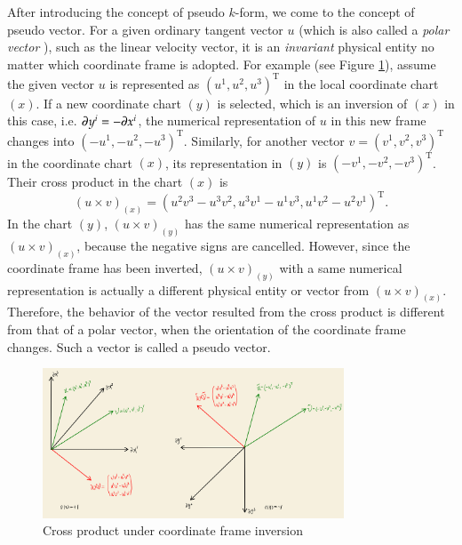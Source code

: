 \documentclass[11pt, a4paper]{book}
\begin{document}
After introducing the concept of pseudo $k$-form, we come to the concept of pseudo vector.
For a given ordinary tangent vector $u$ (which is also called a \emph{polar vector}
\citep{Pseudovector2023}), such as the linear velocity vector, it is an \emph{invariant}
physical entity no matter which coordinate frame is adopted. For example (see Figure
\ref{fig:cross-product-under-inversion}), assume the given vector $u$ is represented as
$(u^1,u^2,u^3)^{\mathrm{T}}$ in the local coordinate chart $(x)$. If a new coordinate
chart $(y)$ is selected, which is an inversion of $(x)$ in this case, i.e.
$\boldsymbol{\partial}y^i = -\boldsymbol{\partial}x^i$, the numerical representation of $u$ in this new
frame changes into $(-u^1,-u^2,-u^3)^{\mathrm{T}}$. Similarly, for another vector
$v = (v^1,v^2,v^3)^{\mathrm{T}}$ in the coordinate chart $(x)$, its representation in
$(y)$ is $(-v^1,-v^2,-v^3)^{\mathrm{T}}$. Their cross product in the chart $(x)$ is
\begin{equation*}
  (u \times v)_{(x)} = (u^2v^3 - u^3v^2, u^3v^1 - u^1v^3, u^1v^2 - u^2v^1)^{\mathrm{T}}.
\end{equation*}
In the chart $(y)$, $(u \times v)_{(y)}$ has the same numerical representation as
$(u \times v)_{(x)}$, because the negative signs are cancelled. However, since the
coordinate frame has been inverted, $(u \times v)_{(y)}$ with a same numerical
representation is actually a different physical entity or vector from
$(u \times v)_{(x)}$. Therefore, the behavior of the vector resulted from the cross
product is different from that of a polar vector, when the orientation of the coordinate
frame changes. Such a vector is called a pseudo vector.
\begin{figure}[htbp]
  \centering
  \includegraphics[width=0.8\textwidth, height=\textheight, keepaspectratio]{figures/2023-12-27-cross-product-under-coordinate-frame-inversion}
  \caption{Cross product under coordinate frame inversion}
  \label{fig:cross-product-under-inversion}
\end{figure}
\end{document}
